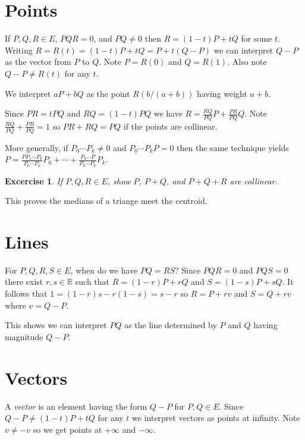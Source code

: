 \documentclass[11pt,fleqn]{article}
\newcommand{\R}{\mathbb{R}}
\newtheorem{ex}{Excercise}[section]
\begin{document}
\section{Points}

If \(P,Q,R\in E\), \(PQR = 0\), and \(PQ\not=0\) then \(R = (1 - t)P +
tQ\) for some \(t\).  Writing \(R = R(t) = (1 - t)P + tQ = P + t(Q - P)\)
we can interpret \(Q - P\) as the vector from \(P\) to \(Q\). Note \(P =
R(0)\) and \(Q = R(1)\).  Also note \(Q - P \not= R(t)\) for any \(t\).

We interpret \(aP + bQ\) as the point \(R(b/(a + b))\) having
weight \(a + b\).

Since \(PR = tPQ\) and \(RQ = (1-t)PQ\) we have \(R = \frac{RQ}{PQ} P +
\frac{PR}{PQ} Q\).  Note \(\frac{RQ}{PQ} + \frac{PR}{PQ} = 1\) so \(PR +
RQ = PQ\) if the points are collinear.

More generally, if \(P_0\cdots P_k\not=0\) and \(P_0\cdots P_k P = 0\)
then the same technique yields \(P = \frac{PP_1\cdots P_k}{P_0\cdots
P_k}P_0 + \cdots + \frac{P_0\cdots P}{P_0\cdots P_k}P_k\).

\begin{ex}
If \(P,Q,R\in E\), show \(P\), \(P + Q\), and \(P + Q + R\) are
collinear.
\end{ex}
This proves the medians of a triange meet the centroid.

\section{Lines}

For \(P,Q,R,S\in E\), when do we have \(PQ = RS\)?
Since \(PQR = 0\) and \(PQS = 0\) there exist \(r,s\in\R\) such
that \(R = (1 - r)P + rQ\) and \(S = (1 - s)P + sQ\).
It follows that \(1 = (1 - r)s - r(1 - s) = s - r\) so
\(R = P + rv\) and \(S = Q + rv\) where \(v = Q - P\).

This shows we can interpret \(PQ\) as the line determined by
\(P\) and \(Q\) having magnitude \(Q - P\).

\section{Vectors}
A {\em vector} is an element having the form \(Q - P\) for \(P,Q\in E\).
Since \(Q - P \not= (1 - t)P + tQ\) for any \(t\) we interpret
vectors as points at infinity. Note \(v \not= -v\) so we get points
at \(+\infty\) and \(-\infty\).


{}
\end{document}
